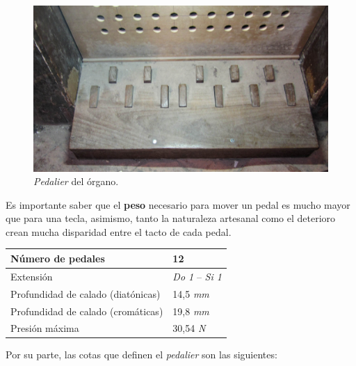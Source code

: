 \begin{figure}[H]
	\noindent \begin{centering}
		\includegraphics[width=\linewidth*3/4]{capitulo3/pedalier}
		\par\end{centering}
	\smallskip
	\caption{\label{fig:pedalier} \textit{Pedalier} del órgano.}
\end{figure} 

\smallskip

Es importante saber que el \textbf{peso} necesario para mover un pedal es mucho mayor que para una tecla, asimismo, tanto la naturaleza artesanal como el deterioro crean mucha disparidad entre el tacto de cada pedal.

\smallskip

\begin{center}
	\begin{tabular}{|l|l|}
		\hline Número de pedales & 12 \\ 
		\hline Extensión & \textit{Do 1} -- \textit{Si 1} \\ 
		\hline Profundidad de calado (diatónicas) & 14,5 \textit{mm} \\ 
		\hline Profundidad de calado (cromáticas) & 19,8 \textit{mm} \\
		\hline Presión máxima & 30,54 \textit{N} \\
		\hline 
	\end{tabular}
	\smallskip
\end{center}

\smallskip

Por su parte, las cotas que definen el \textit{pedalier} son las siguientes:

\smallskip

